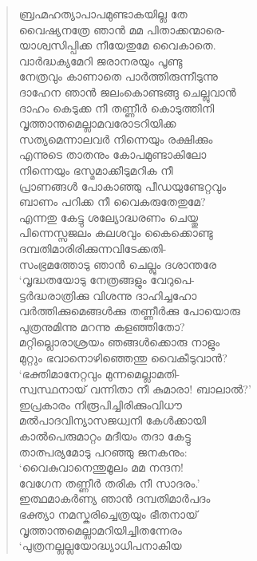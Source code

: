\begin{verse}
ബ്രഹ്മഹത്യാപാപമുണ്ടാകയില്ല തേ\\
വൈഷ്യനത്രേ ഞാന്‍ മമ പിതാക്കന്മാരെ-\\
യാശ്വസിപ്പിക്ക നീയേതുമേ വൈകാതെ.\\
വാര്‍ദ്ധക്യമേറി ജരാനരയും പൂണ്ടു\\
നേത്രവും കാണാതെ പാര്‍ത്തിരുന്നീടുന്നു\\
ദാഹേന ഞാന്‍ ജലംകൊണ്ടങ്ങു ചെല്ലുവാന്‍\\
ദാഹം കെടുക്ക നീ തണ്ണീര്‍ കൊടുത്തിനി\\
വൃത്താന്തമെല്ലാമവരോടറിയിക്ക\\
സത്യമെന്നാലവര്‍ നിന്നെയും രക്ഷിക്കും\\
എന്നുടെ താതനും കോപമുണ്ടാകിലോ\\
നിന്നെയും ഭസ്മമാക്കീടുമറിക നീ\\
പ്രാണങ്ങള്‍ പോകാഞ്ഞു പീഡയുണ്ടേറ്റവും\\
ബാണം പറിക്ക നീ വൈകരുതേതുമേ?\\
എന്നതു കേട്ടു ശല്യോദ്ധരണം ചെയ്തു\\
പിന്നെസ്സജലം കലശവും കൈക്കൊണ്ടു\\
ദമ്പതിമാരിരിക്കുന്നവിടേക്കതി-\\
സംഭ്രമത്തോടു ഞാന്‍ ചെല്ലും ദശാന്തരേ\\
‘വൃദ്ധതയോടു നേത്രങ്ങളും വേറുപെ-\\
ട്ടര്‍ദ്ധരാത്രിക്കു വിശന്നു ദാഹിച്ചഹോ\\
വര്‍ത്തിക്കുമെങ്ങള്‍ക്കു തണ്ണീര്‍ക്കു പോയൊരു\\
പുത്രനുമിന്നു  മറന്നു കളഞ്ഞിതോ?\\
മറ്റില്ലൊരാശ്രയം ഞങ്ങള്‍ക്കൊരു നാളും\\
മുറ്റും ഭവാനൊഴിഞ്ഞെന്തു വൈകീടുവാന്‍?\\
‘ഭക്തിമാനേറ്റവും മുന്നമെല്ലാമതി-\\
സ്വസ്ഥനായ് വന്നിതാ നീ കുമാരാ! ബാലാല്‍?’\\
ഇപ്രകാരം നിരൂപിച്ചിരിക്കുംവിധൗ\\
മല്‍പാദവിന്യാസജധ്വനി കേള്‍ക്കായി\\
കാല്‍പെരുമാറ്റം മദീയം തദാ കേട്ടു\\
താത്പര്യമോടു പറഞ്ഞു ജനകനും:\\
‘വൈകുവാനെന്തുമൂലം മമ നന്ദന!\\
വേഗേന തണ്ണീര്‍ തരിക നീ സാദരം.’\\
ഇത്ഥമാകര്‍ണ്യ ഞാന്‍ ദമ്പതിമാര്‍പദം\\
ഭക്ത്യാ നമസ്കരിച്ചെത്രയും ഭീതനായ്\\
വൃത്താന്തമെല്ലാമറിയിച്ചിതന്നേരം\\
‘പുത്രനല്ലല്ലയോദ്ധ്യാധിപനാകിയ\\

\end{verse}
